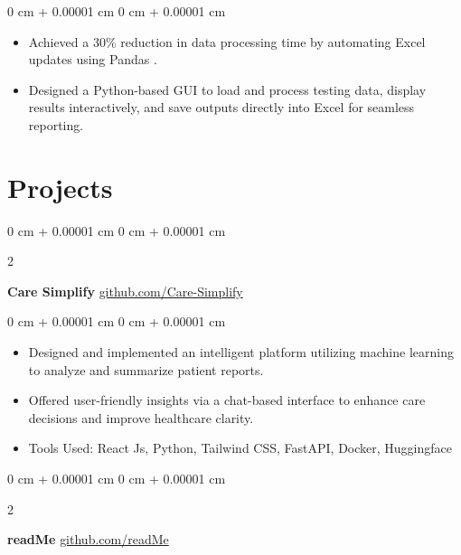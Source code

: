 \documentclass[10pt, letterpaper]{article}
\newenvironment{highlights}{
    \begin{itemize}[
        topsep=0.10 cm,
        parsep=0.10 cm,
        partopsep=0pt,
        itemsep=0pt,
        leftmargin=0 cm + 10pt
    ]
}{
    \end{itemize}
} %
\newenvironment{onecolentry}{
    \begin{adjustwidth}{
        0 cm + 0.00001 cm
    }{
        0 cm + 0.00001 cm
    }
}{
    \end{adjustwidth}
} %
\newenvironment{twocolentry}[2][]{
    \onecolentry
    \def\secondColumn{#2}
    \setcolumnwidth{\fill, 4.5 cm}
    \begin{paracol}{2}
}{
    \switchcolumn \raggedleft \secondColumn
    \end{paracol}
    \endonecolentry
} %
\begin{document}
        \vspace{0.10 cm}
        \begin{onecolentry}
            \begin{highlights}
                \item Achieved a 30\% reduction in data processing time by automating Excel updates using Pandas .
                \item Designed a Python-based GUI to load and process testing data, display results interactively, and save outputs directly into Excel for seamless reporting.
            \end{highlights}
        \end{onecolentry}


    \section{Projects}


        \begin{twocolentry}{
            \href{https://github.com/glunkad/Care-Simplify}{github.com/Care-Simplify}
        }
            \textbf{Care Simplify}\end{twocolentry}

        \vspace{0.10 cm}
        \begin{onecolentry}
            \begin{highlights}
                \item Designed and implemented an intelligent platform utilizing machine learning to analyze and summarize patient reports.
                \item Offered user-friendly insights via a chat-based interface to enhance care decisions and improve healthcare clarity.
                \item Tools Used: React Js, Python, Tailwind CSS, FastAPI, Docker, Huggingface
            \end{highlights}
        \end{onecolentry}


        \vspace{0.2 cm}

        
        \begin{twocolentry}{
            \href{https://github.com/glunkad/readMe}{github.com/readMe}
        }
            \textbf{readMe}\end{twocolentry}
\end{document}
